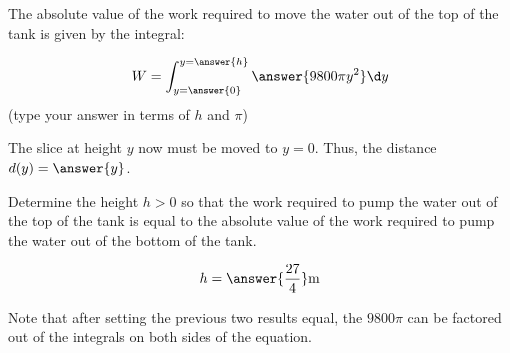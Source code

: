 \documentclass{ximera}
\begin{document}
\begin{exercise}
\begin{exercise}
The absolute value of the work required to move the water out of the top of the tank is given by the integral:

\[
W=\int_{y=\answer{0}}^{y=\answer{h}} \answer{9800\pi y^2} \d y  
\]
(type your answer in terms of $h$ and  $\pi$)

\begin{hint}
The slice at height $y$ now must be moved to $y=0$.  Thus, the distance $d(y) = \answer{y}$.
\end{hint}

\begin{exercise}

Determine the height $h>0$ so that the work required to pump the water out of the top of the tank is equal to the absolute value of the work required to pump the water out of the bottom of the tank.

\[
h=\answer{\frac{27}{4}} \text{m}
\]

\begin{hint}
Note that after setting the previous two results equal, the $9800 \pi$ can be factored out of the integrals on both sides of the equation.
\end{hint}

\end{exercise}
\end{exercise}
\end{exercise}
\end{document}
